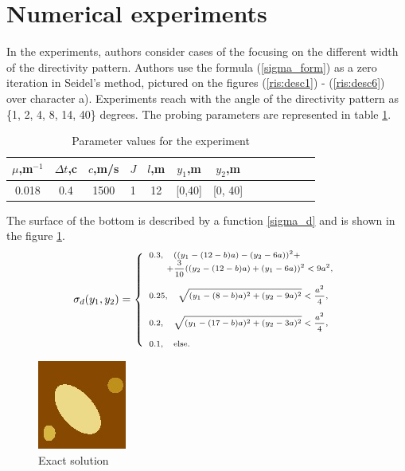 \documentclass{procDDs}
\begin{document}
\section{Numerical experiments}
In the experiments, authors consider cases of the focusing on the different width of the directivity pattern. Authors use the formula (\ref{sigma_form}) as a zero iteration in Seidel's method, pictured on the figures (\ref{ris:desc1}) - (\ref{ris:desc6}) over character a). Experiments reach with the angle of the directivity pattern as  \{1, 2, 4, 8, 14, 40\} degrees. 
The probing parameters are represented in table \ref{table:name}.
\begin{table}[!ht]
	\begin{tabular}{|c|c|c|c|c|c|c|c|c|c|c|c|c|}
		\hline
		$\mu$,m$^{-1}$ & $\Delta t$,c & $c$,m/s & $J$ & $l$,m & $y_1$,m & $y_2$,m\\
		\hline
		0.018 & 0.4 & 1500 & 1 & 12 & [0,40] & [0, 40]\\ \hline
	\end{tabular}
	\label{table:name}
	\caption{Parameter values for the experiment}
\end{table}
The surface of the bottom is described by a function \ref{sigma_d} and is shown in the figure \ref{ris:dno}.
\begin{equation}
\scriptsize
\label{sigma_d}
\sigma_d(y_1, y_2) = 
\left\{
\begin{array}{ll}
0.3 , \quad  ((y_1-(12-b)a)-(y_2-6a))^2+\\ \quad \quad +\dfrac{3}{10}((y_2-(12-b)a)+(y_1-6a))^2<9a^2,  \\ \\
0.25, \quad \sqrt{(y_1-(8-b)a)^2+(y_2-9a)^2}<\dfrac{a^2}{4}, \\ \\
0.2 ,\quad  \sqrt{(y_1-(17-b)a)^2+(y_2-3a)^2}<\dfrac{a^2}{4}, \\ \\
0.1 , \quad \hbox{else.} \\
\end{array}%
\right.
\end{equation}
\begin{figure}[h!]\center
	
	\includegraphics[width=0.3\linewidth]{img/dno.jpg}
	\caption{Exact solution}
	\label{ris:dno}
\end{figure}
\end{document}

